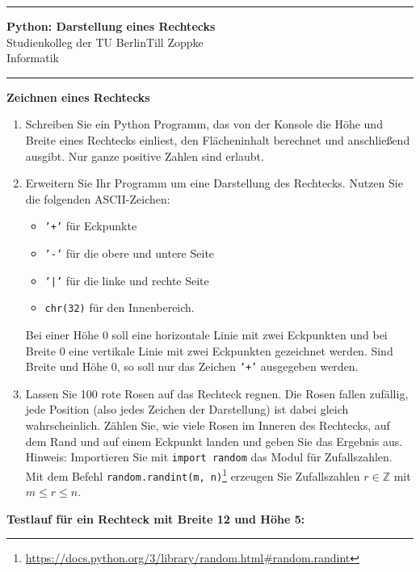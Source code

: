 \documentclass[ngerman,11pt]{article}
\date{\DTMgermanmonthname{\month} \the\year}
\begin{document}
\hrule
\begin{center}
{\large\bf Python: Darstellung eines Rechtecks}\\[-0mm]
Studienkolleg der TU Berlin\hfill Till Zoppke\\
\makeatletter Informatik \hfill \@date\\[2mm] \makeatother
\end{center}
\hrule
\par\bigskip
\noindent
\textbf{Zeichnen eines Rechtecks}

\begin{enumerate}
\item
Schreiben Sie ein Python Programm, das von der Konsole die Höhe und Breite eines Rechtecks einliest, den Flächeninhalt berechnet und anschließend ausgibt. Nur ganze positive Zahlen sind erlaubt.

\item
Erweitern Sie Ihr Programm um eine Darstellung des Rechtecks. Nutzen Sie die folgenden ASCII-Zeichen:
\begin{itemize}
\item \texttt{'+'} für Eckpunkte
\item \texttt{'-'}  für die obere und untere Seite
\item \texttt{'|'}  für die linke und rechte Seite
\item \texttt{chr(32)} für den Innenbereich.
\end{itemize}
Bei einer Höhe 0 soll eine horizontale Linie mit zwei Eckpunkten und bei Breite 0 eine vertikale Linie mit zwei Eckpunkten gezeichnet werden. Sind Breite und Höhe 0, so soll nur das Zeichen \texttt{'+'} ausgegeben werden.

\item
Lassen Sie 100 rote Rosen auf das Rechteck regnen. Die Rosen fallen zufällig, jede Position (also jedes Zeichen der Darstellung) ist dabei gleich wahrscheinlich. Zählen Sie, wie viele Rosen im Inneren des Rechtecks, auf dem Rand und auf einem Eckpunkt landen und geben Sie das Ergebnis aus. Hinweis: Importieren Sie mit \texttt{import random} das Modul für Zufallszahlen. Mit dem Befehl \texttt{random.randint(m, n)}\footnote{\url{https://docs.python.org/3/library/random.html\#random.randint}} erzeugen Sie Zufallszahlen $r \in \mathbb{Z}$ mit $m \leq r \leq n$.
\end{enumerate}

\textbf{Testlauf für ein Rechteck mit Breite 12 und Höhe 5:}
\end{document}
